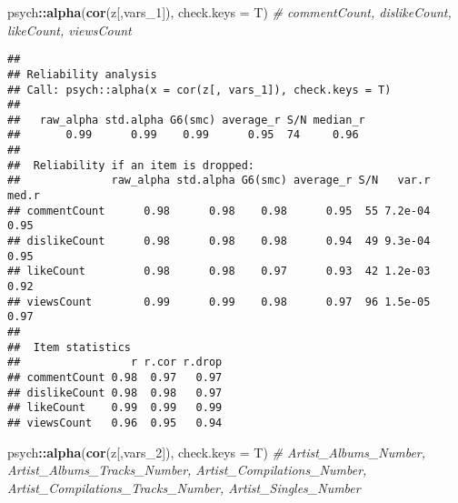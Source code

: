 \documentclass[
]{article}
\newenvironment{Shaded}{\begin{snugshade}}{\end{snugshade}}
\newcommand{\CommentTok}[1]{\textcolor[rgb]{0.56,0.35,0.01}{\textit{#1}}}
\newcommand{\DataTypeTok}[1]{\textcolor[rgb]{0.13,0.29,0.53}{#1}}
\newcommand{\DecValTok}[1]{\textcolor[rgb]{0.00,0.00,0.81}{#1}}
\newcommand{\KeywordTok}[1]{\textcolor[rgb]{0.13,0.29,0.53}{\textbf{#1}}}
\newcommand{\NormalTok}[1]{#1}
\newcommand{\OperatorTok}[1]{\textcolor[rgb]{0.81,0.36,0.00}{\textbf{#1}}}
\begin{document}
\begin{Shaded}
\begin{Highlighting}[]
\NormalTok{psych}\OperatorTok{::}\KeywordTok{alpha}\NormalTok{(}\KeywordTok{cor}\NormalTok{(z[,vars_}\DecValTok{1}\NormalTok{]), }\DataTypeTok{check.keys =}\NormalTok{ T) }\CommentTok{# commentCount, dislikeCount, likeCount, viewsCount}
\end{Highlighting}
\end{Shaded}

\begin{verbatim}
## 
## Reliability analysis   
## Call: psych::alpha(x = cor(z[, vars_1]), check.keys = T)
## 
##   raw_alpha std.alpha G6(smc) average_r S/N median_r
##       0.99      0.99    0.99      0.95  74     0.96
## 
##  Reliability if an item is dropped:
##              raw_alpha std.alpha G6(smc) average_r S/N   var.r med.r
## commentCount      0.98      0.98    0.98      0.95  55 7.2e-04  0.95
## dislikeCount      0.98      0.98    0.98      0.94  49 9.3e-04  0.95
## likeCount         0.98      0.98    0.97      0.93  42 1.2e-03  0.92
## viewsCount        0.99      0.99    0.98      0.97  96 1.5e-05  0.97
## 
##  Item statistics 
##                 r r.cor r.drop
## commentCount 0.98  0.97   0.97
## dislikeCount 0.98  0.98   0.97
## likeCount    0.99  0.99   0.99
## viewsCount   0.96  0.95   0.94
\end{verbatim}

\begin{Shaded}
\begin{Highlighting}[]
\NormalTok{psych}\OperatorTok{::}\KeywordTok{alpha}\NormalTok{(}\KeywordTok{cor}\NormalTok{(z[,vars_}\DecValTok{2}\NormalTok{]), }\DataTypeTok{check.keys =}\NormalTok{ T) }\CommentTok{# Artist_Albums_Number, Artist_Albums_Tracks_Number, Artist_Compilations_Number, Artist_Compilations_Tracks_Number, Artist_Singles_Number}
\end{Highlighting}
\end{Shaded}
\end{document}
